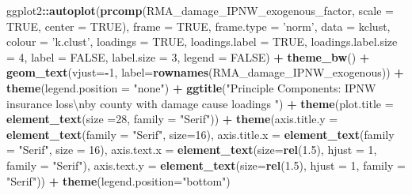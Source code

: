 \documentclass[]{article}
\newenvironment{Shaded}{\begin{snugshade}}{\end{snugshade}}
\newcommand{\CharTok}[1]{\textcolor[rgb]{0.31,0.60,0.02}{#1}}
\newcommand{\DataTypeTok}[1]{\textcolor[rgb]{0.13,0.29,0.53}{#1}}
\newcommand{\DecValTok}[1]{\textcolor[rgb]{0.00,0.00,0.81}{#1}}
\newcommand{\FloatTok}[1]{\textcolor[rgb]{0.00,0.00,0.81}{#1}}
\newcommand{\KeywordTok}[1]{\textcolor[rgb]{0.13,0.29,0.53}{\textbf{#1}}}
\newcommand{\NormalTok}[1]{#1}
\newcommand{\OperatorTok}[1]{\textcolor[rgb]{0.81,0.36,0.00}{\textbf{#1}}}
\newcommand{\OtherTok}[1]{\textcolor[rgb]{0.56,0.35,0.01}{#1}}
\newcommand{\StringTok}[1]{\textcolor[rgb]{0.31,0.60,0.02}{#1}}
\begin{document}
\begin{Shaded}
\begin{Highlighting}[]
\NormalTok{ggplot2}\OperatorTok{::}\KeywordTok{autoplot}\NormalTok{(}\KeywordTok{prcomp}\NormalTok{(RMA_damage_IPNW_exogenous_factor, }\DataTypeTok{scale =} \OtherTok{TRUE}\NormalTok{, }\DataTypeTok{center =} \OtherTok{TRUE}\NormalTok{), }\DataTypeTok{frame =} \OtherTok{TRUE}\NormalTok{, }\DataTypeTok{frame.type =} \StringTok{'norm'}\NormalTok{, }\DataTypeTok{data =}\NormalTok{ kclust, }\DataTypeTok{colour =} \StringTok{'k.clust'}\NormalTok{, }\DataTypeTok{loadings =} \OtherTok{TRUE}\NormalTok{, }\DataTypeTok{loadings.label =} \OtherTok{TRUE}\NormalTok{, }\DataTypeTok{loadings.label.size  =} \DecValTok{4}\NormalTok{, }\DataTypeTok{label =} \OtherTok{FALSE}\NormalTok{, }\DataTypeTok{label.size =} \DecValTok{3}\NormalTok{, }\DataTypeTok{legend =} \OtherTok{FALSE}\NormalTok{)  }\OperatorTok{+}\StringTok{ }\KeywordTok{theme_bw}\NormalTok{()   }\OperatorTok{+}\StringTok{ }\KeywordTok{geom_text}\NormalTok{(}\DataTypeTok{vjust=}\OperatorTok{-}\DecValTok{1}\NormalTok{, }\DataTypeTok{label=}\KeywordTok{rownames}\NormalTok{(RMA_damage_IPNW_exogenous)) }\OperatorTok{+}\StringTok{ }\KeywordTok{theme}\NormalTok{(}\DataTypeTok{legend.position =} \StringTok{"none"}\NormalTok{) }\OperatorTok{+}\StringTok{ }\KeywordTok{ggtitle}\NormalTok{(}\StringTok{"Principle Components: IPNW insurance loss}\CharTok{\textbackslash{}n}\StringTok{by county with damage cause loadings "}\NormalTok{) }\OperatorTok{+}\StringTok{ }\KeywordTok{theme}\NormalTok{(}\DataTypeTok{plot.title =} \KeywordTok{element_text}\NormalTok{(}\DataTypeTok{size =}\DecValTok{28}\NormalTok{, }\DataTypeTok{family =} \StringTok{"Serif"}\NormalTok{)) }\OperatorTok{+}\StringTok{ }\KeywordTok{theme}\NormalTok{(}\DataTypeTok{axis.title.y =} \KeywordTok{element_text}\NormalTok{(}\DataTypeTok{family =} \StringTok{"Serif"}\NormalTok{, }\DataTypeTok{size=}\DecValTok{16}\NormalTok{), }\DataTypeTok{axis.title.x =} \KeywordTok{element_text}\NormalTok{(}\DataTypeTok{family =} \StringTok{"Serif"}\NormalTok{, }\DataTypeTok{size =} \DecValTok{16}\NormalTok{), }\DataTypeTok{axis.text.x =} \KeywordTok{element_text}\NormalTok{(}\DataTypeTok{size=}\KeywordTok{rel}\NormalTok{(}\FloatTok{1.5}\NormalTok{), }\DataTypeTok{hjust =} \DecValTok{1}\NormalTok{, }\DataTypeTok{family =} \StringTok{"Serif"}\NormalTok{), }\DataTypeTok{axis.text.y =} \KeywordTok{element_text}\NormalTok{(}\DataTypeTok{size=}\KeywordTok{rel}\NormalTok{(}\FloatTok{1.5}\NormalTok{), }\DataTypeTok{hjust =} \DecValTok{1}\NormalTok{, }\DataTypeTok{family =} \StringTok{"Serif"}\NormalTok{))  }\OperatorTok{+}\StringTok{ }\KeywordTok{theme}\NormalTok{(}\DataTypeTok{legend.position=}\StringTok{"bottom"}\NormalTok{) }
\end{Highlighting}
\end{Shaded}
\end{document}
